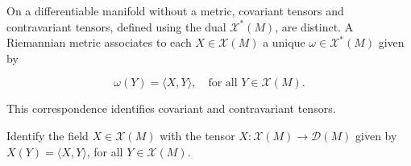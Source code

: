 \begin{remark}[Remark 5.5]
  \label{rem:dc-ch4-5-5}
\leanok
  On a differentiable manifold without a metric, covariant tensors and
  contravariant tensors, defined using the dual $\mathcal{X}^*(M)$, are distinct.
  A Riemannian metric associates to each $X\in\mathcal{X}(M)$ a unique
  $\omega\in\mathcal{X}^*(M)$ given by
  
  $$
  \omega(Y)=\langle X,Y\rangle,\quad\text{for all }Y\in\mathcal{X}(M).
  $$
  
  This correspondence identifies covariant and contravariant tensors.
\end{remark}

\begin{remark}[Remark 5.6]
  \label{rem:dc-ch4-5-6}
\leanok
  Identify the field $X\in\mathcal{X}(M)$ with the tensor
  $X:\mathcal{X}(M)\to\mathcal{D}(M)$ given by $X(Y)=\langle X,Y\rangle$,
  for all $Y\in\mathcal{X}(M)$.
\end{remark}

